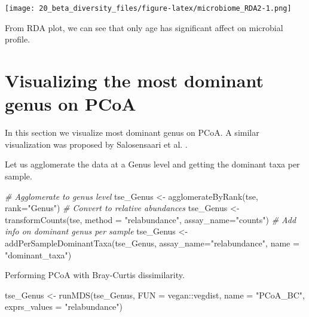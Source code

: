 \documentclass[
]{book}
\newenvironment{Shaded}{\begin{snugshade}}{\end{snugshade}}
\newcommand{\AttributeTok}[1]{\textcolor[rgb]{0.77,0.63,0.00}{#1}}
\newcommand{\CommentTok}[1]{\textcolor[rgb]{0.56,0.35,0.01}{\textit{#1}}}
\newcommand{\FunctionTok}[1]{\textcolor[rgb]{0.00,0.00,0.00}{#1}}
\newcommand{\NormalTok}[1]{#1}
\newcommand{\OtherTok}[1]{\textcolor[rgb]{0.56,0.35,0.01}{#1}}
\newcommand{\SpecialCharTok}[1]{\textcolor[rgb]{0.00,0.00,0.00}{#1}}
\newcommand{\StringTok}[1]{\textcolor[rgb]{0.31,0.60,0.02}{#1}}
\begin{document}
\texttt{[image: 20\_beta\_diversity\_files/figure-latex/microbiome\_RDA2-1.png]}

From RDA plot, we can see that only age has significant affect on microbial profile.

\hypertarget{visualizing-the-most-dominant-genus-on-pcoa}{%
\section{Visualizing the most dominant genus on PCoA}\label{visualizing-the-most-dominant-genus-on-pcoa}}

In this section we visualize most dominant genus on PCoA. A similar visualization was proposed by Salosensaari et al. \citeyearpar{Salosensaari2021}.

Let us agglomerate the data at a Genus level and getting the dominant taxa per sample.

\begin{Shaded}
\begin{Highlighting}[]
\CommentTok{\# Agglomerate to genus level}
\NormalTok{tse\_Genus }\OtherTok{\textless{}{-}} \FunctionTok{agglomerateByRank}\NormalTok{(tse, }\AttributeTok{rank=}\StringTok{"Genus"}\NormalTok{)}
\CommentTok{\# Convert to relative abundances}
\NormalTok{tse\_Genus }\OtherTok{\textless{}{-}} \FunctionTok{transformCounts}\NormalTok{(tse, }\AttributeTok{method =} \StringTok{"relabundance"}\NormalTok{, }\AttributeTok{assay\_name=}\StringTok{"counts"}\NormalTok{)}
\CommentTok{\# Add info on dominant genus per sample}
\NormalTok{tse\_Genus }\OtherTok{\textless{}{-}} \FunctionTok{addPerSampleDominantTaxa}\NormalTok{(tse\_Genus, }\AttributeTok{assay\_name=}\StringTok{"relabundance"}\NormalTok{, }\AttributeTok{name =} \StringTok{"dominant\_taxa"}\NormalTok{)}
\end{Highlighting}
\end{Shaded}

Performing PCoA with Bray-Curtis dissimilarity.

\begin{Shaded}
\begin{Highlighting}[]
\NormalTok{tse\_Genus }\OtherTok{\textless{}{-}} \FunctionTok{runMDS}\NormalTok{(tse\_Genus, }\AttributeTok{FUN =}\NormalTok{ vegan}\SpecialCharTok{::}\NormalTok{vegdist,}
              \AttributeTok{name =} \StringTok{"PCoA\_BC"}\NormalTok{, }\AttributeTok{exprs\_values =} \StringTok{"relabundance"}\NormalTok{)}
\end{Highlighting}
\end{Shaded}
\end{document}
